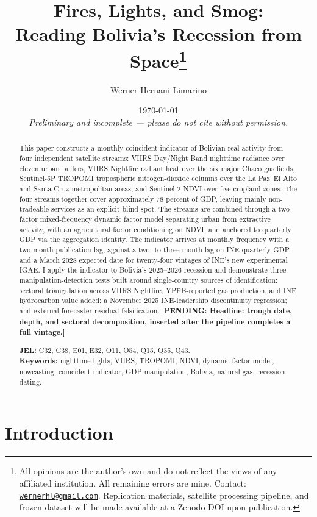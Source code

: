\documentclass[11pt,letterpaper]{article}
\title{\textbf{Fires, Lights, and Smog:\\ Reading Bolivia's Recession from Space}\thanks{All opinions are the author's own and do not reflect the views of any affiliated institution. All remaining errors are mine. Contact: \href{mailto:wernerhl@gmail.com}{\texttt{wernerhl@gmail.com}}. Replication materials, satellite processing pipeline, and frozen dataset will be made available at a Zenodo DOI upon publication.}}
\author{Werner Hernani-Limarino}
\date{\today \\[4pt] \textit{Preliminary and incomplete --- please do not cite without permission.}}
\newcommand{\pend}[1]{\textcolor{yellow!60!black}{\textbf{[PENDING: #1]}}}
\begin{document}
\maketitle

\begin{abstract}
\noindent
This paper constructs a monthly coincident indicator of Bolivian real activity from four independent satellite streams: VIIRS Day/Night Band nighttime radiance over eleven urban buffers, VIIRS Nightfire radiant heat over the six major Chaco gas fields, Sentinel-5P TROPOMI tropospheric nitrogen-dioxide columns over the La Paz--El Alto and Santa Cruz metropolitan areas, and Sentinel-2 NDVI over five cropland zones. The four streams together cover approximately \num{78} percent of GDP, leaving mainly non-tradeable services as an explicit blind spot. The streams are combined through a two-factor mixed-frequency dynamic factor model separating urban from extractive activity, with an agricultural factor conditioning on NDVI, and anchored to quarterly GDP via the \citet{mariano_murasawa2003} aggregation identity. The indicator arrives at monthly frequency with a two-month publication lag, against a two- to three-month lag on INE quarterly GDP and a March 2028 expected date for twenty-four vintages of INE's new experimental IGAE. I apply the indicator to Bolivia's \numrange{2025}{2026} recession and demonstrate three manipulation-detection tests built around single-country sources of identification: sectoral triangulation across VIIRS Nightfire, YPFB-reported gas production, and INE hydrocarbon value added; a November 2025 INE-leadership discontinuity regression; and external-forecaster residual falsification. \pend{Headline: trough date, depth, and sectoral decomposition, inserted after the pipeline completes a full vintage.}
\vspace{0.5em}

\noindent \textbf{JEL:} C32, C38, E01, E32, O11, O54, Q15, Q35, Q43. \\
\noindent \textbf{Keywords:} nighttime lights, VIIRS, TROPOMI, NDVI, dynamic factor model, nowcasting, coincident indicator, GDP manipulation, Bolivia, natural gas, recession dating.
\end{abstract}

\thispagestyle{empty}

\newpage
\setcounter{page}{1}

\section{Introduction}
\label{sec:intro}
\end{document}
